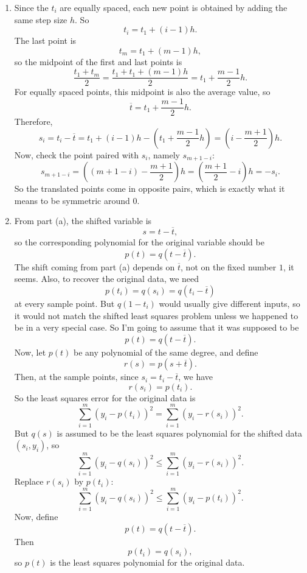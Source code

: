 \documentclass[10pt]{extarticle}
\begin{document}
\begin{enumerate}[label=(\alph*)]
\item Since the $t_i$ are equally spaced, each new point is obtained by adding the same step size $h$. So
\[
t_i=t_1+(i-1)h.
\]
The last point is
\[
t_m=t_1+(m-1)h,
\]
so the midpoint of the first and last points is
\[
\frac{t_1+t_m}{2}
=\frac{t_1+t_1+(m-1)h}{2}
=t_1+\frac{m-1}{2}h.
\]
For equally spaced points, this midpoint is also the average value, so
\[
\overline{t}=t_1+\frac{m-1}{2}h.
\]
Therefore,
\[
s_i=t_i-\overline{t}
=t_1+(i-1)h-\left(t_1+\frac{m-1}{2}h\right)
=\left(i-\frac{m+1}{2}\right)h.
\]
Now, check the point paired with $s_i$, namely $s_{m+1-i}$:
\[
s_{m+1-i}
=\left((m+1-i)-\frac{m+1}{2}\right)h
=\left(\frac{m+1}{2}-i\right)h
=-s_i.
\]
So the translated points come in opposite pairs, which is exactly what it means to be symmetric around $0$.

\item From part (a), the shifted variable is
\[
s=t-\overline{t},
\]
so the corresponding polynomial for the original variable should be
\[
p(t)=q(t-\overline{t}).
\]
The shift coming from part (a) depends on $\overline{t}$, not on the fixed number $1$, it seems. Also, to recover the original data, we need
\[
p(t_i)=q(s_i)=q(t_i-\overline{t})
\]
at every sample point. But $q(1-t_i)$ would usually give different inputs, so it would not match the shifted least squares problem unless we happened to be in a very special case. So I'm going to assume that it was supposed to be
\[
p(t)=q(t-\overline{t}).
\]
Now, let $p(t)$ be any polynomial of the same degree, and define
\[
r(s)=p(s+\overline{t}).
\]
Then, at the sample points, since $s_i=t_i-\overline{t}$, we have
\[
r(s_i)=p(t_i).
\]
So the least squares error for the original data is
\[
\sum_{i=1}^m \left(y_i-p(t_i)\right)^2
=\sum_{i=1}^m \left(y_i-r(s_i)\right)^2.
\]
But $q(s)$ is assumed to be the least squares polynomial for the shifted data $(s_i,y_i)$, so
\[
\sum_{i=1}^m \left(y_i-q(s_i)\right)^2
\le
\sum_{i=1}^m \left(y_i-r(s_i)\right)^2.
\]
Replace $r(s_i)$ by $p(t_i)$:
\[
\sum_{i=1}^m \left(y_i-q(s_i)\right)^2
\le
\sum_{i=1}^m \left(y_i-p(t_i)\right)^2.
\]
Now, define
\[
p(t)=q(t-\overline{t}).
\]
Then
\[
p(t_i)=q(s_i),
\]
so $p(t)$ is the least squares polynomial for the original data.


\end{enumerate}
\end{document}
